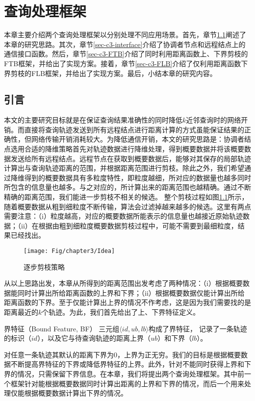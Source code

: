 \chapter{查询处理框架}\label{chapter:framework}
本章主要介绍两个查询处理框架以分别处理不同应用场景。首先，章节\ref{sec-c3-introduction}阐述了本章的研究思路。其次，章节\ref{sec-c3-interface}介绍了协调者节点和远程结点上的通信接口函数。然后，章节\ref{sec-c3-FTB}介绍了同时利用距离函数上、下界剪枝的FTB框架，并给出了实现方案。接着，章节\ref{sec-c3-FLB}介绍了仅利用距离函数下界剪枝的FLB框架，并给出了实现方案。最后，小结本章的研究内容。
\section{引言}\label{sec-c3-introduction}
本文的主要研究目标就是在保证查询结果准确性的同时降低$k$近邻查询时的网络开销。而直接将查询轨迹发送到所有远程结点进行距离计算的方式虽能保证结果的正确性，但网络传输开销消耗较大。为降低通信开销，本文的研究思路是：协调者结点选用合适的降维策略首先对轨迹数据进行降维处理，得到概要数据并将该概要数据发送给所有远程结点。远程节点在获取到概要数据后，能够对其保存的局部轨迹计算出与查询轨迹距离的范围，并根据距离范围进行剪枝。除此之外，我们希望通过降维得到的概要数据具有多粒度特性，即粒度越细，所对应的数据量也越多同时所包含的信息量也越多。与之对应的，所计算出来的距离范围也越精确。通过不断精确的距离范围，我们能进一步剪枝不相关的候选。
整个剪枝过程如图\ref{fig-chapter3-pruningIdea}所示，随着概要数据从粗到细粒度不断传输，算法会过滤掉越来越多的候选。这里有两点需要注意：（i）粒度越高，对应的概要数据所能表示的信息量也越接近原始轨迹数据；（ii）在根据由粗到细粒度概要数据剪枝过程中，可能不需要到最细粒度，结果已经找出。
\begin{figure}
	\centering
	\texttt{[image: Fig/chapter3/Idea]}
	\caption{逐步剪枝策略}
	\label{fig-chapter3-pruningIdea}
\end{figure}


从以上思路出发，本章从所得到的距离范围出发考虑了两种情况：（i）根据概要数据能同时计算出所给距离函数的上界和下界；（ii）根据概要数据仅能计算出所给距离函数的下界。至于仅能计算出上界的情况不作考虑，这是因为我们需要找的是距离最近的$k$个轨迹。为此，我们首先给出了上、下界特征定义。
\begin{define}界特征（Bound Feature, BF） 三元组$\langle id, ub,lb \rangle$构成了界特征， 记录了一条轨迹的标识（$id$），以及它与待查询轨迹的距离上界（$ub$）和下界（$lb$）。
\end{define}
对任意一条轨迹其默认的距离下界为0，上界为正无穷。我们的目标是根据概要数据不断提高界特征的下界或降低界特征的上界。此外，针对不能同时获得上界和下界的情况，只需保留下界信息。在本章，我们将提出两个查询处理框架。其中前一个框架针对能根据概要数据同时计算出距离的上界和下界的情况，而后一个用来处理仅能根据概要数据计算出下界的情况。




